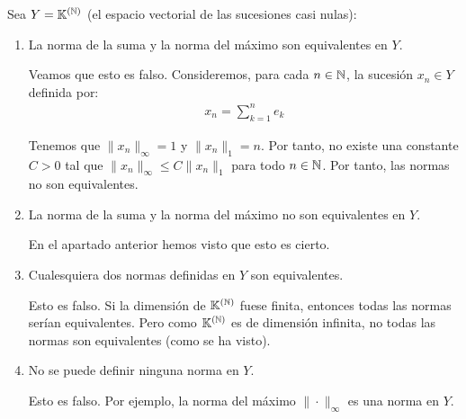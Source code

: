 \documentclass[12pt]{article}
\begin{document}
\begin{ejercicio}
    Sea $Y = \mathbb{K}^{(\mathbb{N})}$ (el espacio vectorial de las sucesiones casi nulas):
    \begin{enumerate}[label=(\alph*)]
        \item La norma de la suma y la norma del máximo son equivalentes en $Y$.
        
        Veamos que esto es falso. Consideremos, para cada $n\in \mathbb{N}$, la sucesión $x_n \in Y$ definida por:
        \begin{align*}
            x_n = \sum_{k=1}^{n} e_k
        \end{align*}

        Tenemos que $\|x_n\|_\infty = 1$ y $\|x_n\|_1 = n$. Por tanto, no existe una constante $C > 0$ tal que $\|x_n\|_\infty \leq C \|x_n\|_1$ para todo $n \in \mathbb{N}$. Por tanto, las normas no son equivalentes.
        \item La norma de la suma y la norma del máximo no son equivalentes en $Y$.
        
        En el apartado anterior hemos visto que esto es cierto.
        \item Cualesquiera dos normas definidas en $Y$ son equivalentes.
        
        Esto es falso. Si la dimensión de $\mathbb{K}^{(\mathbb{N})}$ fuese finita, entonces todas las normas serían equivalentes. Pero como $\mathbb{K}^{(\mathbb{N})}$ es de dimensión infinita, no todas las normas son equivalentes (como se ha visto).
        \item No se puede definir ninguna norma en $Y$.
        
        Esto es falso. Por ejemplo, la norma del máximo $\|\cdot\|_\infty$ es una norma en $Y$.
    \end{enumerate}
\end{ejercicio}
\end{document}

